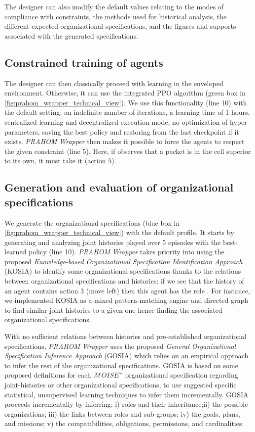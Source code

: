 \documentclass[doubleblind]{ecai}
\newcounter{relation}
\begin{document}
The designer can also modify the default values relating to the modes of compliance with constraints, the methods used for historical analysis, the different expected organizational specifications, and the figures and supports associated with the generated specifications.

\subsection{Constrained training of agents}

The designer can then classically proceed with learning in the enveloped environment. Otherwise, it can use the integrated PPO algorithm (green box in \autoref{fig:prahom_wrapper_technical_view}). We use this functionality (line 10) with the default setting: an indefinite number of iterations, a learning time of 1 hours, centralized learning and decentralized execution mode, no optimization of hyper-parameters, saving the best policy and restoring from the last checkpoint if it exists.
\emph{PRAHOM Wrapper} then makes it possible to force the agents to respect the given constraint (line 5). Here, if  observes that a packet is in the cell superior to its own, it must take it (action $5$).

\subsection{Generation and evaluation of organizational specifications}

We generate the organizational specifications (blue box in \autoref{fig:prahom_wrapper_technical_view}) with the default profile. It starts by generating and analyzing joint histories played over 5 episodes with the best-learned policy (line 10).
\emph{PRAHOM Wrapper} takes priority into using the proposed \emph{Knowledge-based Organizational Specification Identification Approach} (KOSIA) to identify some organizational specifications thanks to the relations between organizational specifications and histories: if we see that the history of an agent contains action $3$ (move left) then this agent has the role .
For instance, we implemented KOSIA as a mixed pattern-matching engine and directed graph to find similar joint-histories to a given one hence finding the associated organizational specifications.

With no sufficient relations between histories and pre-established organizational specifications, \emph{PRAHOM Wrapper} uses the proposed \emph{General Organizational Specification Inference Approach} (GOSIA) which relies on an empirical approach to infer the rest of the organizational specifications. GOSIA is based on some proposed definitions for each $\mathcal{M}OISE^+$ organizational specification regarding joint-histories or other organizational specifications, to use suggested specific statistical, unsupervised learning techniques to infer them incrementally. GOSIA proceeds incrementally by inferring: i) roles and their inheritance;\quad ii) the possible organizations; \quad iii) the links between roles and sub-groups; \quad iv) the goals, plans, and missions; \quad v) the compatibilities, obligations, permissions, and cardinalities.
\end{document}
